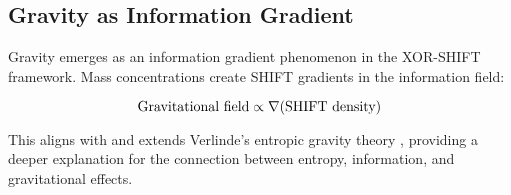 \subsection{Gravity as Information Gradient}

Gravity emerges as an information gradient phenomenon in the XOR-SHIFT framework. Mass concentrations create SHIFT gradients in the information field:

\begin{equation}
\text{Gravitational field} \propto \nabla(\text{SHIFT} \text{ density})
\end{equation}

This aligns with and extends Verlinde's entropic gravity theory \cite{Verlinde2011}, providing a deeper explanation for the connection between entropy, information, and gravitational effects.
